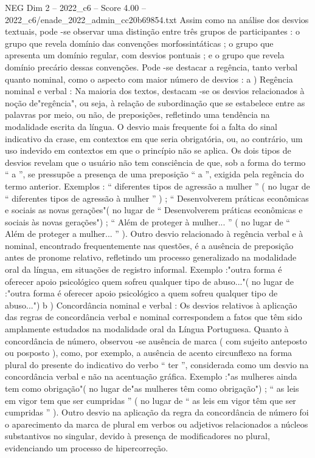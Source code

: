 \begin{textsample}{NEG Dim 2 – 2022\_c6 – Score 4.00 – 2022\_c6/enade\_2022\_admin\_cc20b69854.txt}
Assim como na análise dos desvios textuais, pode -se observar uma distinção entre três grupos de participantes : o grupo que revela domínio das convenções morfossintáticas ; o grupo que apresenta um domínio regular, com desvios pontuais ; e o grupo que revela domínio precário dessas convenções.
Pode -se destacar a regência, tanto verbal quanto nominal, como o aspecto com maior número de desvios : a ) Regência nominal e verbal : Na maioria dos textos, destacam -se os desvios relacionados à noção de"regência", ou seja, à relação de subordinação que se estabelece entre as palavras por meio, ou não, de preposições, refletindo uma tendência na modalidade escrita da língua.
O desvio mais frequente foi a falta do sinal indicativo da crase, em contextos em que seria obrigatória, ou, ao contrário, um uso indevido em contextos em que o princípio não se aplica.
Os dois tipos de desvios revelam que o usuário não tem consciência de que, sob a forma do termo “ a ”, se pressupõe a presença de uma preposição “ a ”, exigida pela regência do termo anterior.
Exemplos : “ diferentes tipos de agressão a mulher ” ( no lugar de “ diferentes tipos de agressão à mulher ” ) ; “ Desenvolverem práticas econômicas e sociais as novas gerações"( no lugar de “ Desenvolverem práticas econômicas e sociais às novas gerações") ; “ Além de proteger à mulher... ” ( no lugar de “ Além de proteger a mulher... ” ).
Outro desvio relacionado à regência verbal e à nominal, encontrado frequentemente nas questões, é a ausência de preposição antes de pronome relativo, refletindo um processo generalizado na modalidade oral da língua, em situações de registro informal.
Exemplo :"outra forma é oferecer apoio psicológico quem sofreu qualquer tipo de abuso..."( no lugar de :"outra forma é oferecer apoio psicológico a quem sofreu qualquer tipo de abuso...") b ) Concordância nominal e verbal : Os desvios relativos à aplicação das regras de concordância verbal e nominal correspondem a fatos que têm sido amplamente estudados na modalidade oral da Língua Portuguesa.
Quanto à concordância de número, observou -se ausência de marca ( com sujeito anteposto ou posposto ), como, por exemplo, a ausência de acento circunflexo na forma plural do presente do indicativo do verbo “ ter ”, considerada como um desvio na concordância verbal e não na acentuação gráfica.
Exemplo :"as mulheres ainda tem como obrigação"( no lugar de"as mulheres têm como obrigação") ; “ as leis em vigor tem que ser cumpridas ” ( no lugar de “ as leis em vigor têm que ser cumpridas ” ).
Outro desvio na aplicação da regra da concordância de número foi o aparecimento da marca de plural em verbos ou adjetivos relacionados a núcleos substantivos no singular, devido à presença de modificadores no plural, evidenciando um processo de hipercorreção.

\end{textsample}
